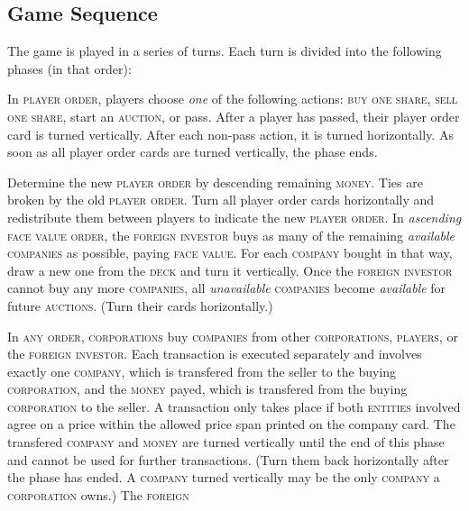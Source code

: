 \documentclass[11pt,a4paper]{article}
\newcounter{itemcounter}
\newenvironment{my_enumerate}
{\begin{list}{\arabic{itemcounter}.}
  {\usecounter{itemcounter}\leftmargin=1.8em}
  \setlength{\itemsep}{1pt}
  \setlength{\parskip}{0pt}
  \setlength{\parsep}{0pt}
}
{\end{list}}
\begin{document}
\begin{multicols}{2}
{\subsection*{Game Sequence}

The game is played in a series of turns. Each turn is divided into the
following phases (in that order):

\begin{my_enumerate}
\item In \textsc{player order}, players choose \emph{one} of the
  following actions: \textsc{buy one share}, \textsc{sell one share},
  start an \textsc{auction}, or pass. After a player has passed, their
  player order card is turned vertically. After each non-pass action,
  it is turned horizontally. As soon as all player order cards are
  turned vertically, the phase ends.
\item Determine the new \textsc{player order} by descending remaining
  \textsc{money}. Ties are broken by the old \textsc{player
    order}. Turn all player order cards horizontally and redistribute
  them between players to indicate the new \textsc{player order}.  In
  \emph{ascending} \textsc{face value order}, the \textsc{foreign
    investor} buys as many of the remaining \emph{available}
  \textsc{companies} as possible, paying \textsc{face value}. For each
  \textsc{company} bought in that way, draw a new one from the
  \textsc{deck} and turn it vertically. Once the \textsc{foreign
    investor} cannot buy any more \textsc{companies}, all
  \emph{unavailable} \textsc{companies} become \emph{available} for
  future \textsc{auctions}. (Turn their cards horizontally.)
\item In \textsc{any order}, \textsc{corporations} buy
  \textsc{companies} from other \textsc{corporations},
  \textsc{players}, or the \textsc{foreign investor}. Each transaction
  is executed separately and involves exactly one \textsc{company},
  which is transfered from the seller to the buying
  \textsc{corporation}, and the \textsc{money} payed, which is
  transfered from the buying \textsc{corporation} to the seller. A
  transaction only takes place if both \textsc{entities} involved
  agree on a price within the allowed price span printed on the
  company card. The transfered \textsc{company} and \textsc{money} are
  turned vertically until the end of this phase and cannot be used for
  further transactions. (Turn them back horizontally after the phase
  has ended. A \textsc{company} turned vertically may be the only
  \textsc{company} a \textsc{corporation} owns.) The \textsc{foreign
}
\end{my_enumerate}}
\end{multicols}
\end{document}
